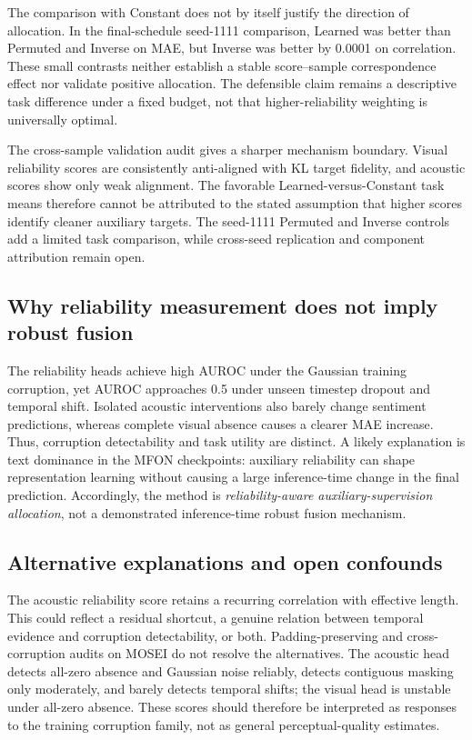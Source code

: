 The comparison with Constant does not by itself justify the direction of
allocation. In the final-schedule seed-1111 comparison,
Learned was better than Permuted and Inverse on MAE, but Inverse was better by
0.0001 on correlation. These small contrasts neither establish a stable
score--sample correspondence effect nor validate positive allocation. The
defensible claim remains a descriptive task difference under a fixed budget,
not that higher-reliability weighting is universally optimal.

The cross-sample validation audit gives a sharper mechanism boundary. Visual
reliability scores are consistently anti-aligned with KL target fidelity, and
acoustic scores show only weak alignment. The favorable Learned-versus-Constant
task means therefore cannot be attributed to the stated assumption that higher
scores identify cleaner auxiliary targets. The seed-1111 Permuted and Inverse
controls add a limited task comparison, while cross-seed replication and
component attribution remain open.

\subsection{Why reliability measurement does not imply robust
fusion}\label{why-reliability-measurement-does-not-imply-robust-fusion}

The reliability heads achieve high AUROC under the Gaussian training
corruption, yet AUROC approaches 0.5 under unseen timestep dropout and
temporal shift. Isolated acoustic interventions also barely change sentiment
predictions, whereas complete visual absence causes a clearer MAE increase.
Thus, corruption detectability and task utility are distinct. A likely
explanation is text dominance in the MFON checkpoints: auxiliary reliability
can shape representation learning without causing a large inference-time
change in the final prediction. Accordingly, the method is
\emph{reliability-aware auxiliary-supervision allocation}, not a demonstrated
inference-time robust fusion mechanism.

\subsection{Alternative explanations and open
confounds}\label{alternative-explanations-and-open-confounds}

The acoustic reliability score retains a recurring correlation with
effective length. This could reflect a residual shortcut, a genuine relation
between temporal evidence and corruption detectability, or both.
Padding-preserving and cross-corruption audits on MOSEI do not resolve the
alternatives. The acoustic head detects all-zero absence and Gaussian noise
reliably, detects contiguous masking only moderately, and barely detects
temporal shifts; the visual head is unstable under all-zero absence. These
scores should therefore be interpreted as responses to the training
corruption family, not as general perceptual-quality estimates.

